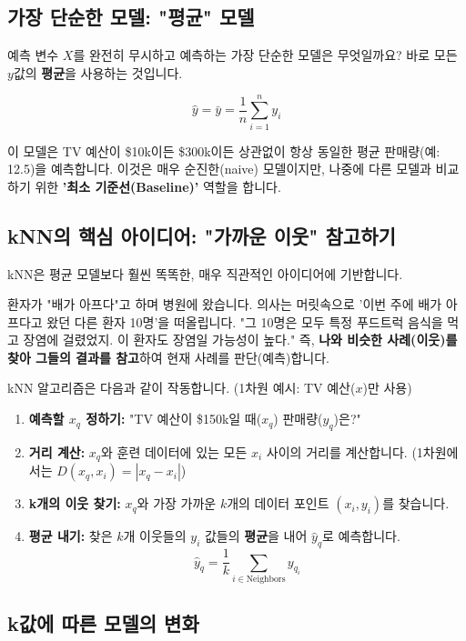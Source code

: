 \documentclass[11pt,a4paper]{book}
\theoremstyle{definition}
\begin{document}
\subsection{가장 단순한 모델: "평균" 모델}

예측 변수 $X$를 완전히 무시하고 예측하는 가장 단순한 모델은 무엇일까요?
바로 모든 $y$값의 \textbf{평균}을 사용하는 것입니다.

$$ \hat{y} = \bar{y} = \frac{1}{n}\sum_{i=1}^{n}y_{i} $$

이 모델은 TV 예산이 \$10k이든 \$300k이든 상관없이 항상 동일한 평균 판매량(예: 12.5)을 예측합니다.
이것은 매우 순진한(naive) 모델이지만, 나중에 다른 모델과 비교하기 위한 \textbf{'최소 기준선(Baseline)'} 역할을 합니다.

\subsection{kNN의 핵심 아이디어: "가까운 이웃" 참고하기}

kNN은 평균 모델보다 훨씬 똑똑한, 매우 직관적인 아이디어에 기반합니다.

\begin{analogybox}[title={의사의 진단 비유}]
환자가 "배가 아프다"고 하며 병원에 왔습니다.
의사는 머릿속으로 '이번 주에 배가 아프다고 왔던 다른 환자 10명'을 떠올립니다.
"그 10명은 모두 특정 푸드트럭 음식을 먹고 장염에 걸렸었지. 이 환자도 장염일 가능성이 높다."
즉, \textbf{나와 비슷한 사례(이웃)를 찾아 그들의 결과를 참고}하여 현재 사례를 판단(예측)합니다.
\end{analogybox}

kNN 알고리즘은 다음과 같이 작동합니다. (1차원 예시: TV 예산($x$)만 사용)

\begin{enumerate}
    \item \textbf{예측할 $x_q$ 정하기:} "TV 예산이 \$150k일 때($x_q$) 판매량($y_q$)은?"
    \item \textbf{거리 계산:} $x_q$와 훈련 데이터에 있는 모든 $x_i$ 사이의 거리를 계산합니다. (1차원에서는 $D(x_q, x_i) = |x_q - x_i|$)
    \item \textbf{k개의 이웃 찾기:} $x_q$와 가장 가까운 $k$개의 데이터 포인트 $(x_i, y_i)$를 찾습니다.
    \item \textbf{평균 내기:} 찾은 $k$개 이웃들의 $y_i$ 값들의 \textbf{평균}을 내어 $\hat{y}_q$로 예측합니다.
        $$ \hat{y}_{q} = \frac{1}{k}\sum_{i \in \text{Neighbors}} y_{q_{i}} $$
\end{enumerate}

\subsection{k값에 따른 모델의 변화}
\end{document}
